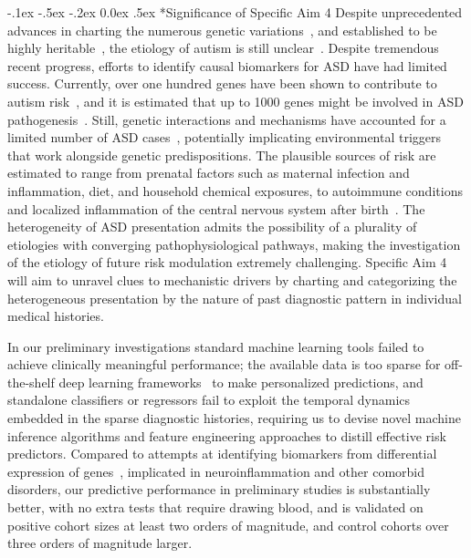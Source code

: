 \documentclass[onecolumn, compsoc,11pt]{IEEEtran}
\makeatletter
\renewcommand\paragraph{\@startsection {section}{1}{\z@}%
                                   {-.1ex \@plus -.5ex \@minus -.2ex}%
                                   {0.0ex \@plus.5ex}%
                                   {\fontsize{11}{10}\selectfont\bfseries\itshape\sffamily\color{black}}}
\def\treatment{positive\xspace}
\makeatother
\begin{document}
\paragraph*{Significance of Specific Aim 4}
Despite unprecedented  advances in charting the numerous genetic variations~\cite{Satterstrom484113}, and established to be highly heritable~\cite{sandin17}, the etiology of autism is still unclear~\cite{pmid29691724,pmid29307081}.
Despite tremendous recent progress, efforts to  identify  causal biomarkers for ASD have had limited success. Currently,  over one hundred genes have been shown to contribute to autism risk~\cite{pmid26402605,pmid25038753,Satterstrom484113}, and it is  estimated that up to 1000 genes might be involved in ASD pathogenesis~\cite{pmid27891212}. Still, genetic interactions and mechanisms have accounted for a limited number of ASD cases~\cite{pmid18414403}, potentially implicating   environmental triggers that  work alongside genetic predispositions. The plausible sources of  risk are estimated to range from prenatal  factors such as maternal infection and inflammation, diet, and  household chemical exposures,  to autoimmune conditions and localized inflammation of the central nervous system after birth~\cite{pmid30971960,pmid30941018,pmid29691724,pmid29307081,pmid27351598,pmid26793298,pmid30095240,pmid25681541}. The heterogeneity of ASD presentation  admits the possibility of a plurality of   etiologies with converging pathophysiological pathways, making the investigation of the etiology of future risk modulation extremely challenging. Specific Aim 4 will aim to unravel clues to mechanistic drivers by charting and categorizing the heterogeneous presentation by the nature of past diagnostic pattern in individual medical histories.

% 
In our preliminary investigations  standard machine learning  tools failed to achieve clinically meaningful performance; the available data is too sparse for  off-the-shelf deep learning frameworks~\cite{pmid27185194} to make personalized predictions, and standalone classifiers or regressors fail to exploit the temporal dynamics embedded in the sparse diagnostic histories, requiring us to devise novel machine inference algorithms and feature engineering approaches to distill effective risk predictors.
%
Compared to  attempts at identifying  biomarkers from differential expression  of
 genes~\cite{pmid22917206,pmid25739104,pmid24363828,pmid23227143},
 implicated in  neuroinflammation and other comorbid disorders, our predictive performance in preliminary studies is substantially better, with no extra tests that require drawing blood, and is validated on \treatment cohort sizes at least two orders of magnitude, and control cohorts over three orders of magnitude larger.
\end{document}
